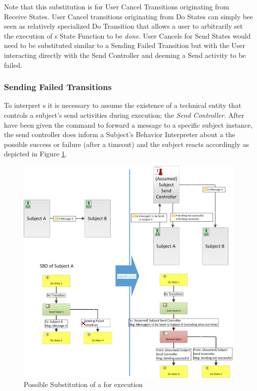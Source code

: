 Note that this substitution is for User Cancel Transitions originating from Receive States. User Cancel transitions originating from Do States can simply bee seen as relatively specialized Do Transition that allows a user to arbitrarily set the execution of s State Function to be \textit{done}. User Cancels for Send States would need to be substituted similar to a Sending Failed Transition but with the User interacting directly with the Send Controller and deeming a Send activity to be failed.  

\subsubsection{Sending Failed Transitions}
\label{sec:sendingFailedTransitionsExecution}

To interpret s it is necessary to assume the existence of a technical entity that controls a subject's send activities during execution; the \textit{Send Controller}. After have been given the command to forward a message to a specific subject instance, the send controller does inform a Subject's Behavior Interpreter about a the possible success or failure (after a timeout) and the subject reacts accordingly as depicted in Figure \ref{fig:sendingfailedSubstituion}.


\begin{figure}[hp]
	\centering
	\includegraphics[width=1.0\linewidth]{Figures/Ontology/SendingFailedInterpretationSIDSBD.png}
	\caption[Possible Substitution of a  for execution]{Possible Substitution of a  for execution}
	\label{fig:sendingfailedSubstituion}
\end{figure}

